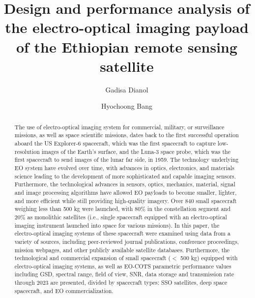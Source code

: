 \documentclass[final,5p,times,twocolumn]{elsarticle}
\begin{document}
\begin{frontmatter}

\title{Design and performance analysis of the electro-optical imaging payload of the Ethiopian remote sensing satellite}

\author[1]{Gadisa Dianol}
\author[1]{Hyochoong Bang}

\begin{abstract}
The use of electro-optical imaging system for commercial, military, or surveillance missions, as well as space scientific missions, dates back to the first successful operation aboard the US Explorer-6 spacecraft, which was the first spacecraft to capture low-resolution images of the Earth's surface, and the Luna-3 space probe, which was the first spacecraft to send images of the lunar far side, in 1959. The technology underlying EO system have evolved over time, with advances in optics, electronics, and materials science leading to the development of more sophisticated and capable imaging sensors. Furthermore, the technological advances in sensors, optics, mechanics, material, signal and image processing algorithms have allowed EO payloads to become smaller, lighter, and more efficient while still providing high-quality imagery.
Over 840 small spacecraft weighing less than 500 kg were launched, with 80\% in the constellation segment and 20\% as monolithic satellites (i.e., single spacecraft equipped with an electro-optical imaging instrument launched into space for various missions). In this paper, the electro-optical imaging systems of these spacecraft were examined using data from a variety of sources, including peer-reviewed journal publications, conference proceedings, mission webpages, and other publicly available satellite databases. 
Furthermore, the technological and commercial expansion of small spacecraft ($<$ 500 kg) equipped with electro-optical imaging systems, as well as EO-COTS parametric performance values including GSD, spectral range, field of view, SNR, data storage and transmission rate through 2023 are presented, divided by spacecraft types: SSO satellites, deep space spacecraft, and EO commercialization.
\end{abstract}


\end{frontmatter}
\end{document}
